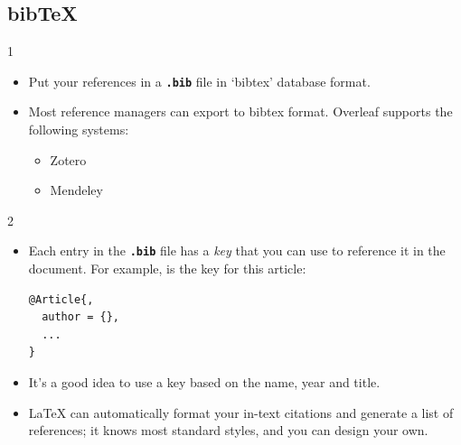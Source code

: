 \documentclass{beamer}
\newcommand{\bftt}[1]{\textbf{\texttt{#1}}}
\begin{document}
\subsection{bib\TeX}
\begin{frame}[fragile]{\insertsubsection{} 1}
\begin{itemize}
\item Put your references in a \bftt{.bib} file in `bibtex' database format.
\item Most reference managers can export to bibtex format. Overleaf supports the following systems:
\begin{itemize}
    \item Zotero
    \item Mendeley
\end{itemize}
\end{itemize}
\end{frame}


\begin{frame}[fragile]{\insertsubsection{} 2}
\begin{itemize}
\item Each entry in the \bftt{.bib} file has a \emph{key} that you can use to
reference it in the document. For example, \bftt{} is the key for this article:
\begin{verbatim}
@Article{,
  author = {},
  ...
}
\end{verbatim}
\item It's a good idea to use a key based on the name, year and title.
\item \LaTeX{} can automatically format your in-text citations and generate a
list of references; it knows most standard styles, and you can design your own.
\end{itemize}
\end{frame}
\end{document}
